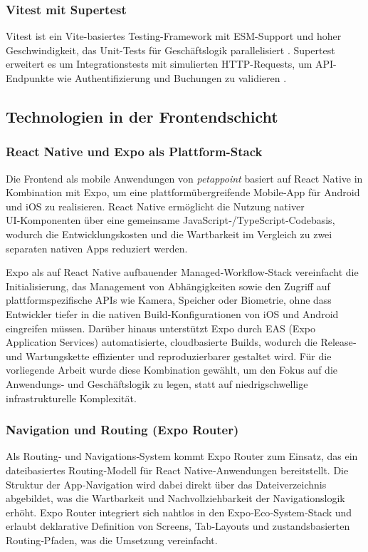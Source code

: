 \subsubsection{Vitest mit Supertest}
Vitest ist ein Vite-basiertes Testing-Framework mit ESM-Support und hoher Geschwindigkeit, das Unit-Tests für Geschäftslogik parallelisiert \cite{vitest-docs}. Supertest erweitert es um Integrationstests mit simulierten HTTP-Requests, um API-Endpunkte wie Authentifizierung und Buchungen zu validieren \cite{supertest-docs}.

\subsection{Technologien in der Frontendschicht}

\subsubsection{React Native und Expo als Plattform-Stack}

Die Frontend als mobile Anwendungen von \textit{petappoint} basiert auf React Native in Kombination mit Expo, um eine plattformübergreifende Mobile‑App für Android und iOS zu realisieren. React Native ermöglicht die Nutzung nativer UI‑Komponenten über eine gemeinsame JavaScript‑/TypeScript‑Codebasis, wodurch die Entwicklungskosten und die Wartbarkeit im Vergleich zu zwei separaten nativen Apps reduziert werden.

Expo als auf React Native aufbauender Managed‑Workflow‑Stack vereinfacht die Initialisierung, das Management von Abhängigkeiten sowie den Zugriff auf plattformspezifische APIs wie Kamera, Speicher oder Biometrie, ohne dass Entwickler tiefer in die nativen Build‑Konfigurationen von iOS und Android eingreifen müssen. Darüber hinaus unterstützt Expo durch EAS (Expo Application Services) automatisierte, cloudbasierte Builds, wodurch die Release‑ und Wartungskette effizienter und reproduzierbarer gestaltet wird. Für die vorliegende Arbeit wurde diese Kombination gewählt, um den Fokus auf die Anwendungs‑ und Geschäftslogik zu legen, statt auf niedrigschwellige infrastrukturelle Komplexität.

\subsubsection{Navigation und Routing (Expo Router)}

Als Routing‑ und Navigations‑System kommt Expo Router zum Einsatz, das ein dateibasiertes Routing‑Modell für React Native‑Anwendungen bereitstellt. Die Struktur der App‑Navigation wird dabei direkt über das Dateiverzeichnis abgebildet, was die Wartbarkeit und Nachvollziehbarkeit der Navigationslogik erhöht. 
Expo Router integriert sich nahtlos in den Expo‑Eco‑System‑Stack und erlaubt deklarative Definition von Screens, Tab‑Layouts und zustandsbasierten Routing‑Pfaden, was die Umsetzung vereinfacht.

